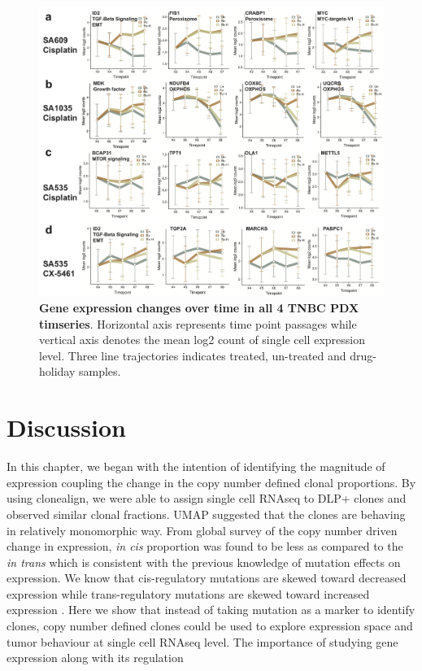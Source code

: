 \begin{figure}
\centering
 \includegraphics[width=\textwidth]{Figures/chap5/genelinetrajecregressionanalysis.png}
	
\caption[Gene expression changes over time]
	{\small
	 \textbf{Gene expression changes over time in all 4 TNBC PDX timseries}.
	Horizontal axis represents time point passages while vertical axis denotes the mean log2 count of single cell expression level. Three line trajectories indicates treated, un-treated and drug-holiday samples. }

	\label{fig:generegressionanalysis}
\end{figure}


\section{Discussion}

In this chapter, we began with the intention of identifying the magnitude of expression coupling the change in the copy number defined clonal proportions. By using clonealign, we were able to assign single cell RNAseq to  DLP+ clones and observed similar clonal fractions. \ac{UMAP} suggested that the clones are behaving in relatively monomorphic way. From global survey of the copy number driven change in expression, \textit{in cis} proportion was found to be less as compared to the \textit{in trans} which is consistent with the previous knowledge of mutation effects on expression. We know that cis-regulatory mutations are skewed toward decreased expression while trans-regulatory mutations are skewed toward increased expression \cite{metzger2016contrasting}. Here we show that instead of taking mutation as a marker to identify clones, copy number defined clones could be used to explore expression  space and tumor behaviour at single cell RNAseq level. The importance of studying gene expression along with its regulation 

